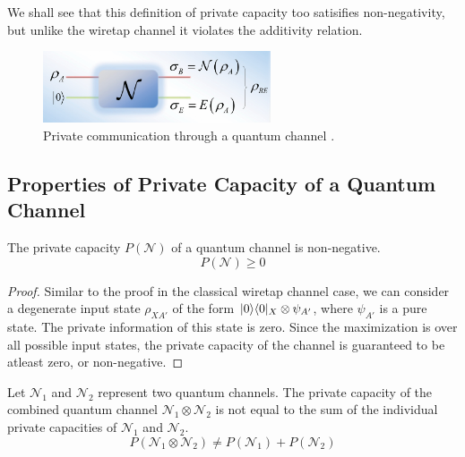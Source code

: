 We shall see that this definition of private capacity too satisifies non-negativity, but unlike the wiretap channel it violates the additivity relation.

\begin{figure}[H]
    \centering
    \includegraphics[width=0.6\textwidth]{figures/private_communication_quantum_channel.png}
    \caption{Private communication through a quantum channel \cite{Gyongyosi_2018}.}
\end{figure}

\subsection{Properties of Private Capacity of a Quantum Channel}

\begin{theorem}
The private capacity $P(\mathcal{N})$ of a quantum channel is non-negative.
$$P(\mathcal{N}) \geq 0$$
\end{theorem}

\begin{proof}
Similar to the proof in the classical wiretap channel case, we can consider a degenerate input state $\rho_{XA'}$ of the form $\lvert0\rangle\langle0\rvert_X \otimes \psi_{A'}$, where $\psi_{A'}$ is a pure state. The private information of this state is zero. Since the maximization is over all possible input states, the private capacity of the channel is guaranteed to be atleast zero, or non-negative.
\end{proof}

\begin{theorem}
Let $\mathcal{N}_1$ and $\mathcal{N}_2$ represent two quantum channels. The private capacity of the combined quantum channel $\mathcal{N}_1 \otimes \mathcal{N}_2$ is not equal to the sum of the individual private capacities of $\mathcal{N}_1$ and $\mathcal{N}_2$.
$$P(\mathcal{N}_1 \otimes \mathcal{N}_2) \neq P(\mathcal{N}_1) + P(\mathcal{N}_2)$$
\end{theorem}

